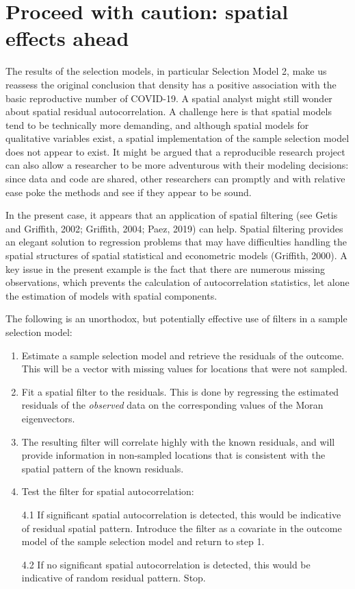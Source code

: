 \documentclass[]{elsarticle} %
\begin{document}
\hypertarget{proceed-with-caution-spatial-effects-ahead}{%
\section{Proceed with caution: spatial effects
ahead}\label{proceed-with-caution-spatial-effects-ahead}}

The results of the selection models, in particular Selection Model 2,
make us reassess the original conclusion that density has a positive
association with the basic reproductive number of COVID-19. A spatial
analyst might still wonder about spatial residual autocorrelation. A
challenge here is that spatial models tend to be technically more
demanding, and although spatial models for qualitative variables exist,
a spatial implementation of the sample selection model does not appear
to exist. It might be argued that a reproducible research project can
also allow a researcher to be more adventurous with their modeling
decisions: since data and code are shared, other researchers can
promptly and with relative ease poke the methods and see if they appear
to be sound.

In the present case, it appears that an application of spatial filtering
(see Getis and Griffith, 2002; Griffith, 2004; Paez, 2019) can help.
Spatial filtering provides an elegant solution to regression problems
that may have difficulties handling the spatial structures of spatial
statistical and econometric models (Griffith, 2000). A key issue in the
present example is the fact that there are numerous missing
observations, which prevents the calculation of autocorrelation
statistics, let alone the estimation of models with spatial components.

The following is an unorthodox, but potentially effective use of filters
in a sample selection model:

\begin{enumerate}
\def\labelenumi{\arabic{enumi}.}
\item
  Estimate a sample selection model and retrieve the residuals of the
  outcome. This will be a vector with missing values for locations that
  were not sampled.
\item
  Fit a spatial filter to the residuals. This is done by regressing the
  estimated residuals of the \emph{observed} data on the corresponding
  values of the Moran eigenvectors.
\item
  The resulting filter will correlate highly with the known residuals,
  and will provide information in non-sampled locations that is
  consistent with the spatial pattern of the known residuals.
\item
  Test the filter for spatial autocorrelation:

  4.1 If significant spatial autocorrelation is detected, this would be
  indicative of residual spatial pattern. Introduce the filter as a
  covariate in the outcome model of the sample selection model and
  return to step 1.

  4.2 If no significant spatial autocorrelation is detected, this would
  be indicative of random residual pattern. Stop.
\end{enumerate}
\end{document}
